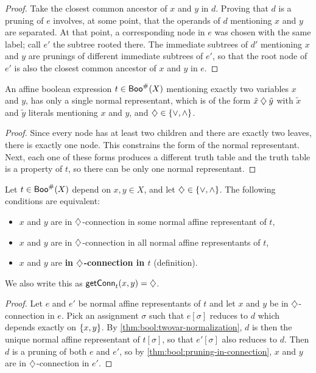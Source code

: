 \documentclass[a4paper]{memoir}
\begin{document}
\begin{proof}
	Take the closest common ancestor of $x$ and $y$ in $d$.
	Proving that $d$ is a pruning of $e$ involves, at some point, that the operands of $d$ mentioning $x$ and $y$ are separated.
	At that point, a corresponding node in $e$ was chosen with the same label; call $e'$ the subtree rooted there.
	The immediate subtrees of $d'$ mentioning $x$ and $y$ are prunings of different immediate subtrees of $e'$, so that the root node of $e'$ is also the closest common ancestor of $x$ and $y$ in $e$.
\end{proof}
\begin{lemma} \label{thm:bool:twovar-normalization}
	An affine boolean expression $t \in \mathsf{Boo}^\#(X)$ mentioning exactly two variables $x$ and $y$, has only a single normal representant, which is of the form $\tilde x \mathbin{\diamondsuit} \tilde y$ with $\tilde x$ and $\tilde y$ literals mentioning $x$ and $y$, and $\mathbin{\diamondsuit} \in \mathopen{}\left\{ {\vee}, {\wedge} \right\}\mathclose{}$.
\end{lemma}
\begin{proof}
	Since every node has at least two children and there are exactly two leaves, there is exactly one node. This constrains the form of the normal representant.
	Next, each one of these forms produces a different truth table and the truth table is a property of $t$, so there can be only one normal representant.
\end{proof}
\begin{lemma} \label{thm:bool:term-in-connection}
	Let $t \in \mathsf{Boo}^\#(X)$ depend on $x, y \in X$, and let $\mathbin{\diamondsuit} \in \mathopen{}\left\{ {\vee}, {\wedge} \right\}\mathclose{}$. The following conditions are equivalent:
	\begin{itemize}
		\item $x$ and $y$ are in $\mathbin{\diamondsuit}$-connection in some normal affine representant of $t$,
		\item $x$ and $y$ are in $\mathbin{\diamondsuit}$-connection in all normal affine representants of $t$,
		\item $x$ and $y$ are \textbf{in $\mathbin{\diamondsuit}$-connection in $t$} (definition).
	\end{itemize}
	We also write this as $\mathsf{getConn}_{t}(x, y) = {\mathbin{\diamondsuit}}$.
\end{lemma}
\begin{proof}
	Let $e$ and $e'$ be normal affine representants of $t$ and let $x$ and $y$ be in $\mathbin{\diamondsuit}$-connection in $e$.
	Pick an assignment $\sigma$ such that $e[\sigma]$ reduces to $d$ which depends exactly on $\mathopen{}\left\{ x, y \right\}\mathclose{}$.
	By \cref{thm:bool:twovar-normalization}, $d$ is then the unique normal affine representant of $t[\sigma]$, so that $e'[\sigma]$ also reduces to $d$.
	Then $d$ is a pruning of both $e$ and $e'$, so by \cref{thm:bool:pruning-in-connection}, $x$ and $y$ are in $\mathbin{\diamondsuit}$-connection in $e'$.
\end{proof}
\end{document}
